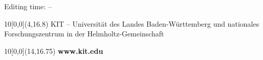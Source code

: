 \begin{titlepage}
{  }
  \vspace*{0.5cm}
  \begin{center}
    \large{Editing time: \hspace*{0.01cm} \timestart \hspace*{0.25cm} -- \hspace*{0.25cm} \timeend}
  \end{center}
  \begin{textblock}{10}[0,0](4,16.8)
    \tiny{KIT -- Universit\"at des Landes Baden-W\"urttemberg und nationales Forschungszentrum in der Helmholtz-Gemeinschaft}
  \end{textblock}
  \begin{textblock}{10}[0,0](14,16.75)
    \large{\textbf{www.kit.edu}}
  \end{textblock}
\end{titlepage}

\newpage
\thispagestyle{empty}
\mbox{}

